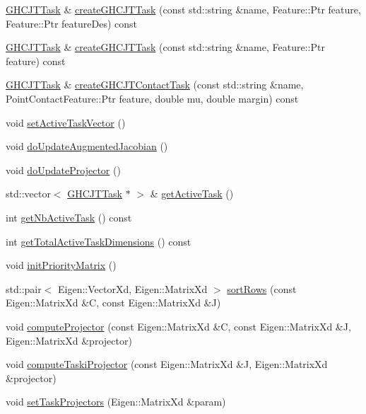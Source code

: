 \begin{DoxyCompactItemize}
\item 
\hyperlink{classgocra_1_1GHCJTTask}{G\+H\+C\+J\+T\+Task} \& \hyperlink{classgocra_1_1GHCJTController_a12429f470c5ec2e7f2c55e9c5cddfee0}{create\+G\+H\+C\+J\+T\+Task} (const std\+::string \&name, Feature\+::\+Ptr feature, Feature\+::\+Ptr feature\+Des) const 
\item 
\hyperlink{classgocra_1_1GHCJTTask}{G\+H\+C\+J\+T\+Task} \& \hyperlink{classgocra_1_1GHCJTController_a451e2db22bf586f42727d24714d72b83}{create\+G\+H\+C\+J\+T\+Task} (const std\+::string \&name, Feature\+::\+Ptr feature) const 
\item 
\hyperlink{classgocra_1_1GHCJTTask}{G\+H\+C\+J\+T\+Task} \& \hyperlink{classgocra_1_1GHCJTController_ac2c85a0870f827fa97d7f4c120ce84b4}{create\+G\+H\+C\+J\+T\+Contact\+Task} (const std\+::string \&name, Point\+Contact\+Feature\+::\+Ptr feature, double mu, double margin) const 
\item 
void \hyperlink{classgocra_1_1GHCJTController_aaee75cf0731450ec268d0dbcfb3504c3}{set\+Active\+Task\+Vector} ()
\item 
void \hyperlink{classgocra_1_1GHCJTController_ad15bf75052d51753ba0454e040dac8dc}{do\+Update\+Augmented\+Jacobian} ()
\item 
void \hyperlink{classgocra_1_1GHCJTController_a5d54c1726d3b72f04f0a1e9cffd91bde}{do\+Update\+Projector} ()
\item 
std\+::vector$<$ \hyperlink{classgocra_1_1GHCJTTask}{G\+H\+C\+J\+T\+Task} $\ast$ $>$ \& \hyperlink{classgocra_1_1GHCJTController_af09ad8960438c443c899b16c66a3838d}{get\+Active\+Task} ()
\item 
int \hyperlink{classgocra_1_1GHCJTController_abf339010121b31109129b54556323b68}{get\+Nb\+Active\+Task} () const 
\item 
int \hyperlink{classgocra_1_1GHCJTController_acade7ff2fde37b9e3c7b708e737aec52}{get\+Total\+Active\+Task\+Dimensions} () const 
\item 
void \hyperlink{classgocra_1_1GHCJTController_a259208518d68271b441369d1538fe362}{init\+Priority\+Matrix} ()
\item 
std\+::pair$<$ Eigen\+::\+Vector\+Xd, Eigen\+::\+Matrix\+Xd $>$ \hyperlink{classgocra_1_1GHCJTController_a5ef80e1ba5c3b2d14352fe06ba7b20e4}{sort\+Rows} (const Eigen\+::\+Matrix\+Xd \&C, const Eigen\+::\+Matrix\+Xd \&J)
\item 
void \hyperlink{classgocra_1_1GHCJTController_ab06ee2982ac337cdad4d11fe2a570e94}{compute\+Projector} (const Eigen\+::\+Matrix\+Xd \&C, const Eigen\+::\+Matrix\+Xd \&J, Eigen\+::\+Matrix\+Xd \&projector)
\item 
void \hyperlink{classgocra_1_1GHCJTController_a7c544e46be7f415675f68f3c4fe6be93}{compute\+Taski\+Projector} (const Eigen\+::\+Matrix\+Xd \&J, Eigen\+::\+Matrix\+Xd \&projector)
\item 
void \hyperlink{classgocra_1_1GHCJTController_a517d7603b3506a09ec7c5ed9b22bd7a9}{set\+Task\+Projectors} (Eigen\+::\+Matrix\+Xd \&param)
\end{DoxyCompactItemize}
